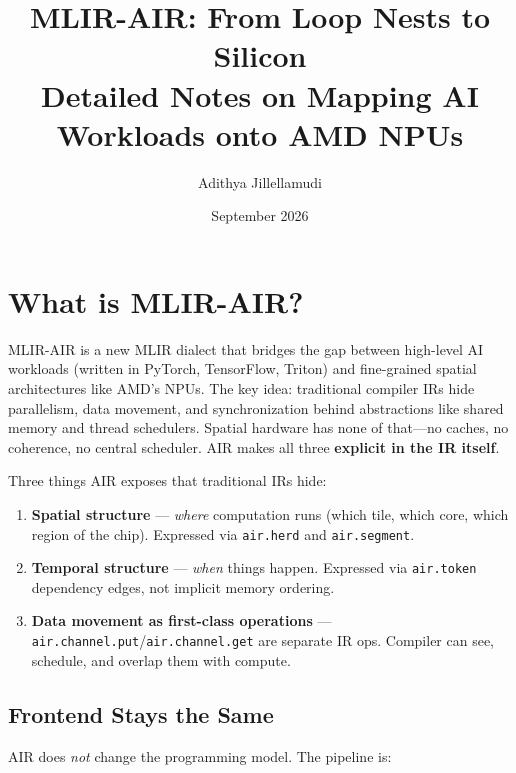 \documentclass[11pt,a4paper]{article}
\title{\textbf{MLIR-AIR: From Loop Nests to Silicon}\\[0.5em]
\large Detailed Notes on Mapping AI Workloads onto AMD NPUs}
\author{Adithya Jillellamudi}
\date{September 2026}
\begin{document}
\maketitle
\tableofcontents
\newpage

\section{What is MLIR-AIR?}

MLIR-AIR is a new MLIR dialect that bridges the gap between high-level AI workloads
(written in PyTorch, TensorFlow, Triton) and fine-grained spatial architectures like
AMD's NPUs. The key idea: traditional compiler IRs hide parallelism, data movement,
and synchronization behind abstractions like shared memory and thread schedulers.
Spatial hardware has none of that---no caches, no coherence, no central scheduler.
AIR makes all three \textbf{explicit in the IR itself}.

Three things AIR exposes that traditional IRs hide:

\begin{enumerate}[leftmargin=2em]
  \item \textbf{Spatial structure} --- \emph{where} computation runs (which tile,
    which core, which region of the chip). Expressed via \texttt{air.herd} and
    \texttt{air.segment}.
  \item \textbf{Temporal structure} --- \emph{when} things happen. Expressed via
    \texttt{air.token} dependency edges, not implicit memory ordering.
  \item \textbf{Data movement as first-class operations} ---
    \texttt{air.channel.put}/\texttt{air.channel.get} are separate IR ops. Compiler
    can see, schedule, and overlap them with compute.
\end{enumerate}

\subsection{Frontend Stays the Same}

AIR does \emph{not} change the programming model. The pipeline is:
\end{document}
